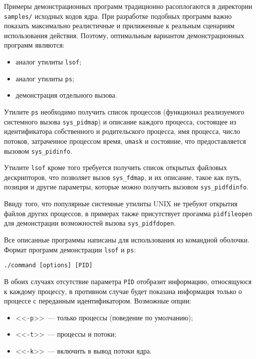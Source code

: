 Примеры демонстрационных программ традиционно расоплогаются в директории
\texttt{samples/} исходных кодов ядра. При разработке подобных программ важно
показать максимально реалистичные и прилиженные к реальным сценариям
использования действия. Поэтому, оптимальным вариантом демонстрационных программ
являются:
\begin{itemize}
\item аналог утилиты \texttt{lsof};
\item аналог утилиты \texttt{ps};
\item демонстрация отдельного вызова.
\end{itemize}

Утилите \texttt{ps} необходимо получить список процессов (функционал
реализуемого системного вызова \texttt{sys\_pidmap}) и описание каждого процесса,
состоящее из идентификатора собственного и родительского процесса, имя процесса,
число потоков, затраченное процессом время, \texttt{umask} и состояние, что
предоставляется вызовом \texttt{sys\_pidinfo}.

Утилите \texttt{lsof} кроме того требуется получить список открытых файловых
дескрипторов, что позволяет вызов \texttt{sys\_fdmap}, и их описание, такое как
путь, позиция и другие параметры, которые можно получить вызовом
\texttt{sys\_pidfdinfo}.

Ввиду того, что популярные системные утилиты UNIX не требуют открытия файлов
других процессов, в примерах также присутствует прогамма \texttt{pidfileopen}
для демонстрации возможностей вызова \texttt{sys\_pidfdopen}.

Все описанные программы написаны для использования из командной оболочки. Формат
программ демонстрации \texttt{lsof} и \texttt{ps}:

\medskip
\begin{lstlisting}[style=cstyle]
./command [options] [PID]
\end{lstlisting}
\medskip

В обоих случаях отсутствие параметра \texttt{PID} отобразит информацию,
относящуюся к каждому процессу, в противном случае будет показана информация
только о процессе с переданным идентификатором. Возможные опции:
\begin{itemize}
\item <<\texttt{-p}>>~--- только процессы (поведение по умолчанию);
\item <<\texttt{-t}>>~--- процессы и потоки;
\item <<\texttt{-k}>>~--- включить в вывод потоки ядра.
\end{itemize}

